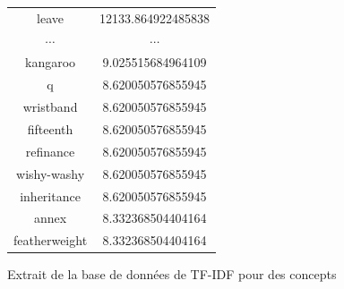 \documentclass[a4paper, 12pt]{article}
\begin{document}
\begin{figure}[!h]
\begin{center}
\begin{tabular}{|c|c|}
  leave & 12133.864922485838   \\
 $\cdots$ & $\cdots$ \\
    kangaroo  & 9.025515684964109  \\
  q  & 8.620050576855945  \\
  wristband  & 8.620050576855945  \\
  fifteenth  & 8.620050576855945  \\
  refinance  & 8.620050576855945  \\
  wishy-washy  & 8.620050576855945  \\
  inheritance  & 8.620050576855945  \\
  annex  & 8.332368504404164  \\
  featherweight  & 8.332368504404164 \\
  \hline
 \end{tabular}
\label{fig:TFIDFConcepts}
\caption{Extrait de la base de données de TF-IDF pour des concepts}
\end{center}
\end{figure}
\end{document}
